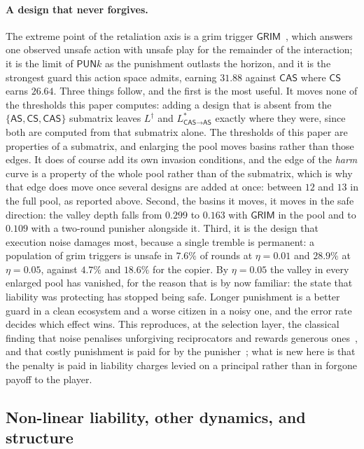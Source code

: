 \documentclass[11pt,a4paper]{article}
\theoremstyle{definition}
\newcommand{\AS}{\textsf{AS}}
\newcommand{\CS}{\textsf{CS}}
\newcommand{\CAS}{\textsf{CAS}}
\begin{document}
\paragraph{A design that never forgives.}
The extreme point of the retaliation axis is a grim
trigger $\mathsf{GRIM}$~\citep{friedman1971supergames},
which answers one observed unsafe action with unsafe play for the remainder of
the interaction; it is the limit of $\mathsf{PUN}k$ as the punishment outlasts
the horizon, and it is the strongest guard this action space admits, earning
$31.88$ against $\CAS$ where $\CS$ earns $26.64$. Three things follow, and the
first is the most useful. It moves none of the thresholds this paper computes:
adding a design that is absent from the $\{\AS,\CS,\CAS\}$ submatrix leaves
$L^{\dagger}$ and $L^{*}_{\CAS\to\AS}$ exactly where they were, since both are
computed from that submatrix alone. The thresholds of this paper are
properties of a submatrix, and enlarging the pool moves basins rather than
those edges. It does of course add its own invasion conditions, and the edge
of the \emph{harm} curve is a property of the whole pool rather than of the
submatrix, which is why that edge does move once several designs are added at
once: between $12$ and $13$ in the full pool, as reported above. Second, the
basins it moves, it moves in the safe direction: the valley
depth falls from $0.299$ to $0.163$ with $\mathsf{GRIM}$ in the pool and to
$0.109$ with a two-round punisher alongside it. Third, it is the design that
execution noise damages most, because a single tremble is permanent: a
population of grim triggers is unsafe in $7.6\%$ of rounds at $\eta=0.01$ and
$28.9\%$ at $\eta=0.05$, against $4.7\%$ and $18.6\%$ for the copier. By
$\eta=0.05$ the valley in every enlarged pool has vanished, for the reason
that is by now familiar: the state that liability was protecting has stopped
being safe. Longer punishment is a better guard in a clean ecosystem and a
worse citizen in a noisy one, and the error rate decides which effect wins.
This reproduces, at the selection layer, the classical finding that noise
penalises unforgiving reciprocators and rewards generous
ones~\citep{molander1985optimal,nowak1992tit,fudenberg2012slow}, and that
costly punishment is paid for by the punisher~\citep{dreber2008winners}; what
is new here is that
the penalty is paid in liability charges levied on a principal rather than in
forgone payoff to the player.

\subsection{Non-linear liability, other dynamics, and structure}\label{sec:general}
\end{document}
